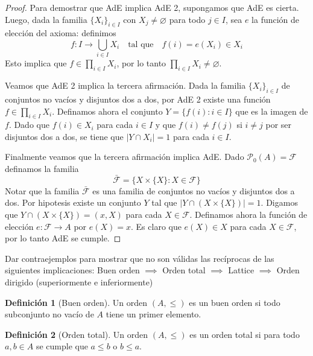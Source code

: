 \documentclass{article}
\theoremstyle{definition}
\newtheorem{definition}{Definición}[section]
\newenvironment{ejercicio}[1]{\begin{trivlist}
\item[\hskip \labelsep {\bfseries Ejercicio}\hskip \labelsep {\bfseries #1.}]}{\end{trivlist}}
\begin{document}
\begin{proof}
    Para demostrar que AdE implica AdE 2, supongamos que AdE es cierta. Luego, dada la familia \( {\{ X_i \}}_{i \in I} \) con \( X_j \neq \varnothing \) para todo \( j \in I \), sea \( e \) la función de elección del axioma:
    definimos \[
        f: I \to \bigcup_{i \in I} X_i \quad \text{tal que} \quad f(i) = e(X_i) \in X_i
    \]
    Esto implica que \( f \in \prod_{i \in I} X_i \), por lo tanto \( \prod_{i \in I} X_i \neq \varnothing \).

    Veamos que AdE 2 implica la tercera afirmación. Dada la familia \( {\{ X_i \}}_{i \in I} \) de conjuntos no vacíos y disjuntos dos a dos, por AdE 2 existe una función \( f \in \prod_{i \in I} X_i \).
    Definamos ahora el conjunto \( Y = \{ f(i) : i \in I \} \) que es la imagen de \( f \). Dado que \( f(i) \in X_i \) para cada \( i \in I \) y que \( f(i) \neq f(j) \) si \( i \neq j \) por ser disjuntos dos a dos,
    se tiene que \( |Y \cap X_i| = 1 \) para cada \( i \in I \).

    Finalmente veamos que la tercera afirmación implica AdE. Dado \( \mathcal{P_0}(A) = \mathcal{F} \) definamos la familia \[
        \mathcal{\bar{F}} = \{ X \times \{ X \} : X \in \mathcal{F} \}
    \]
    Notar que la familia \( \mathcal{\bar{F}} \) es una familia de conjuntos no vacíos y disjuntos dos a dos. Por hipotesis existe un conjunto \( Y \) tal que \( |Y \cap (X \times \{ X \})| = 1 \).
    Digamos que \( Y \cap (X \times \{ X \}) = (x, X) \) para cada \( X \in \mathcal{F} \). Definamos ahora la función de elección \( e : \mathcal{F} \to A \) por \( e(X) = x \). Es claro que \( e(X) \in X \) para cada \( X \in \mathcal{F} \), por lo tanto AdE se cumple.
\end{proof}

\begin{ejercicio}{8}
    Dar contraejemplos para mostrar que no son válidas las recíprocas de las siguientes implicaciones:
    Buen orden \( \implies \) Orden total \( \implies \) Lattice \( \implies \) Orden dirigido (superiormente e inferiormente)
\end{ejercicio}

\begin{definition}[Buen orden]
    Un orden \( (A, \leq) \) es un buen orden si todo subconjunto no vacío de \( A \) tiene un primer elemento.
\end{definition}

\begin{definition}[Orden total]
    Un orden \( (A, \leq) \) es un orden total si para todo \( a, b \in A \) se cumple que \( a \leq b \) o \( b \leq a \).
\end{definition}
\end{document}

